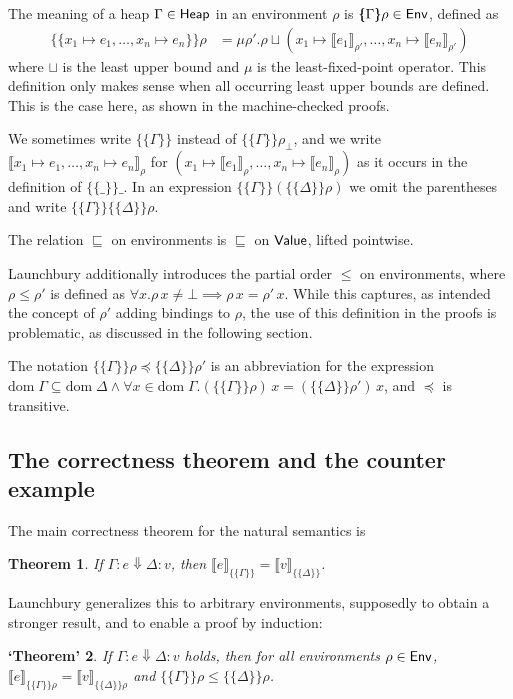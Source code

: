\documentclass{jfp1}
\newtheorem{theorem}{Theorem}
\newtheorem{falsetheorem}[theorem]{‘Theorem’}
\theoremstyle{nonumberbreak}
\newcommand{\sHeap} {\text{\textsf{Heap}}}
\newcommand{\sValue}{\text{\textsf{Value}}}
\newcommand{\sEnv}  {\text{\textsf{Env}}}
\newcommand{\sred}[4]{#1 : #2 \Downarrow #3 : #4}
\newcommand{\dom}[1]{\text{dom}\;#1}
\newcommand{\xen}{x_1\mapsto e_1, \ldots, x_n\mapsto e_n}
\newcommand{\dsem}[2]{\llbracket #1 \rrbracket_{#2}}
\newcommand{\esem}[1]{\{\!\!\!\{#1\}\!\!\!\}}
\begin{document}
The meaning of a heap $\Gamma \in \sHeap$ in an environment $\rho$ is $\esem \Gamma \rho \in \sEnv$, defined as
\begin{align*}
\esem{ \xen}\rho 
&= \mu \rho'. \rho \sqcup (x_1 \mapsto \dsem{e_1}{\rho'}, \ldots, x_n \mapsto \dsem{e_n}{\rho'})
\end{align*}
where $\sqcup$ is the least upper bound and $\mu$ is the least-fixed-point operator. This definition only makes sense when all occurring least upper bounds are defined. This is the case here, as shown in the machine-checked proofs.

We sometimes write $\esem{\Gamma}$ instead of $\esem{\Gamma}{\rho_\bot}$, and we write $\dsem{\xen}\rho$ for $(x_1\mapsto \dsem{e_1}\rho,\ldots,x_n\mapsto \dsem{e_n}\rho)$ as it occurs in the definition of $\esem{\_}\_$. In an expression $\esem{\Gamma}(\esem{\Delta}\rho)$ we omit the parentheses and write $\esem{\Gamma}\esem{\Delta}\rho$.

The relation $\sqsubseteq$ on environments is $\sqsubseteq$ on $\sValue$, lifted pointwise.

Launchbury additionally introduces the partial order $\le$ on environments, where $\rho \le \rho'$ is defined as $\forall x. \rho\, x \ne \bot \implies \rho\,x =\rho'\,x$. While this captures, as intended the concept of $\rho'$ adding bindings to $\rho$, the use of this definition in the proofs is problematic, as discussed in the following section.

The notation $\esem{\Gamma}\rho \preceq \esem{\Delta}{\rho'}$ is an abbreviation for the expression $\dom\Gamma \subseteq \dom\Delta \wedge \forall x\in \dom\Gamma. (\esem{\Gamma}\rho)\,x = (\esem{\Delta}{\rho'})\,x$, and $\preceq$ is transitive.


\subsection{The correctness theorem and the counter example}
\label{counterexample}

The main correctness theorem for the natural semantics is
\begin{theorem}
If $\sred \Gamma e \Delta v$, then $\dsem{e}{\esem{\Gamma}} = \dsem{v}{\esem{\Delta}}$.
\label{thm:main}
\end{theorem}

Launchbury generalizes this to arbitrary environments, supposedly to obtain a stronger result, and to enable a proof by induction:

\begin{falsetheorem}
If $\sred \Gamma e \Delta v$ holds, then for all environments $\rho \in \sEnv$, $\dsem{e}{\esem{\Gamma}{\rho}} = \dsem{v}{\esem{\Delta}{\rho}}$ and $\esem\Gamma\rho \le \esem\Delta\rho$.%
\label{thm:false}
\end{falsetheorem}
\end{document}
